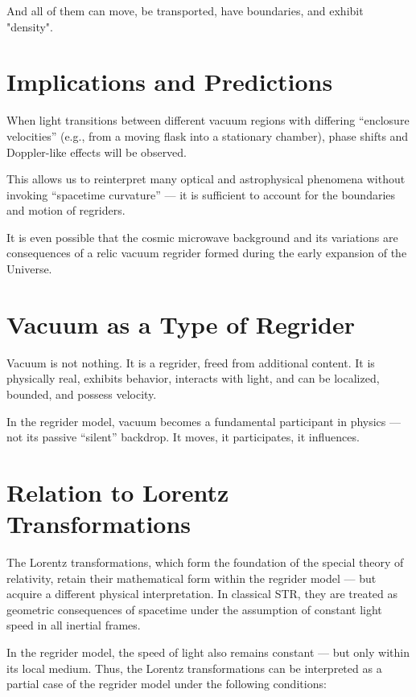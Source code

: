 \documentclass[12pt]{article}
\begin{document}
And all of them can move, be transported, have boundaries, and exhibit "density".


\section*{Implications and Predictions}

When light transitions between different vacuum regions with differing “enclosure velocities” (e.g., from a moving flask into a stationary chamber), phase shifts and Doppler-like effects will be observed.

This allows us to reinterpret many optical and astrophysical phenomena without invoking “spacetime curvature” — it is sufficient to account for the boundaries and motion of regriders.

It is even possible that the cosmic microwave background and its variations are consequences of a relic vacuum regrider formed during the early expansion of the Universe.

\section*{Vacuum as a Type of Regrider}

Vacuum is not nothing. It is a regrider, freed from additional content. It is physically real, exhibits behavior, interacts with light, and can be localized, bounded, and possess velocity.

In the regrider model, vacuum becomes a fundamental participant in physics — not its passive “silent” backdrop. It moves, it participates, it influences.

\section*{Relation to Lorentz Transformations}

The Lorentz transformations, which form the foundation of the special theory of relativity, retain their mathematical form within the regrider model — but acquire a different physical interpretation. In classical STR, they are treated as geometric consequences of spacetime under the assumption of constant light speed in all inertial frames.

In the regrider model, the speed of light also remains constant — but only within its local medium. Thus, the Lorentz transformations can be interpreted as a partial case of the regrider model under the following conditions:
\end{document}
